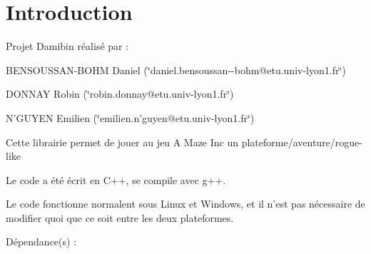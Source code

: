 \hypertarget{index_intro}{}\section{Introduction}\label{index_intro}
Projet Damibin réalisé par \+: ~\newline

\begin{DoxyItemize}
\item B\+E\+N\+S\+O\+U\+S\+S\+A\+N-\/\+B\+O\+H\+M Daniel (\char`\"{}daniel.\+bensoussan-\/-\/bohm@etu.\+univ-\/lyon1.\+fr\char`\"{}) ~\newline

\item D\+O\+N\+N\+A\+Y Robin (\char`\"{}robin.\+donnay@etu.\+univ-\/lyon1.\+fr\char`\"{}) ~\newline

\item N'G\+U\+Y\+E\+N Emilien (\char`\"{}emilien.\+n'guyen@etu.\+univ-\/lyon1.\+fr\char`\"{})~\newline

\end{DoxyItemize}

Cette librairie permet de jouer au jeu A Maze Inc un plateforme/aventure/rogue-\/like ~\newline


Le code a été écrit en C++, se compile avec g++. ~\newline


Le code fonctionne normalent sous Linux et Windows, et il n'est pas nécessaire de modifier quoi que ce soit entre les deux plateformes. ~\newline


Dépendance(s) \+: ~\newline

